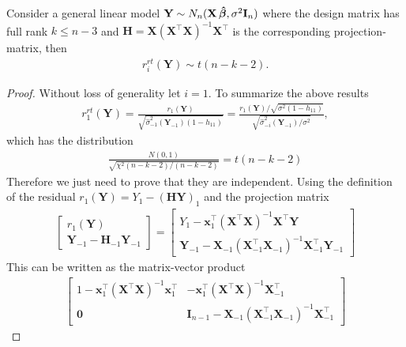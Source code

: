 \begin{proposition}
    Consider a general linear model $\textbf{Y} \sim N_n(\textbf{X} \operatorname{\boldsymbol{\hat{\beta}}}, \sigma^2 \textbf{I}_n)$ where the design matrix has full rank $k \leq n-3$ and $\textbf{H} = \textbf{X} (\textbf{X}^\top \textbf{X})^{-1}\textbf{X}^\top$ is the corresponding projection-matrix, then
    \begin{align*}
        r_i^{rt}(\textbf{Y}) \sim t(n-k-2).
    \end{align*}
\end{proposition}
\begin{proof}
    Without loss of generality let $i=1$. 
    To summarize the above results
    \begin{align*}
        r_1^{rt}(\textbf{Y}) = \frac{r_1(\textbf{Y})}{\sqrt{\hat{\sigma}^2_{-1}(\textbf{Y}_{-1})(1-h_{11})}}
        =
        \frac{r_1(\textbf{Y})/ \sqrt{\sigma^2 (1-h_{11})}}{\sqrt{\hat{\sigma}_{-i}^2 (\textbf{Y}_{-1})/\sigma^2}},
    \end{align*}
    which has the distribution
    \begin{align*}
        \frac{N(0,1)}{\sqrt{\chi^2(n-k-2)/(n-k-2)}} = t(n-k-2)
    \end{align*}
    Therefore we just need to prove that they are independent.
    Using the definition of the residual $r_1(\textbf{Y}) = Y_1 -  (\textbf{HY})_1$ and the projection matrix
    \begin{align*}
        \begin{bmatrix}
            r_1(\textbf{Y}) \\
            \textbf{Y}_{-1} - \textbf{H}_{-1} \textbf{Y}_{-1}
        \end{bmatrix}
        =
        \begin{bmatrix}
            Y_1 - \textbf{x}_1^\top (\textbf{X}^\top \textbf{X})^{-1} \textbf{X}^\top \textbf{Y} \\
            \textbf{Y}_{-1} - \textbf{X}_{-1} (\textbf{X}_{-1}^\top \textbf{X}_{-1})^{-1} \textbf{X}_{-1}^\top \textbf{Y}_{-1}
        \end{bmatrix}
    \end{align*}
    This can be written as the matrix-vector product
    \begin{align*}
        \begin{bmatrix}
            1 - \textbf{x}_1^\top (\textbf{X}^\top \textbf{X})^{-1} \textbf{x}_1^\top & - \textbf{x}_1^\top (\textbf{X}^\top \textbf{X})^{-1} \textbf{X}_{-1}^\top \\
            \textbf{0} & \textbf{I}_{n-1} - \textbf{X}_{-1} (\textbf{X}_{-1}^\top \textbf{X}_{-1})^{-1} \textbf{X}_{-1}^\top

\end{bmatrix}
\end{align*}
\end{proof}
